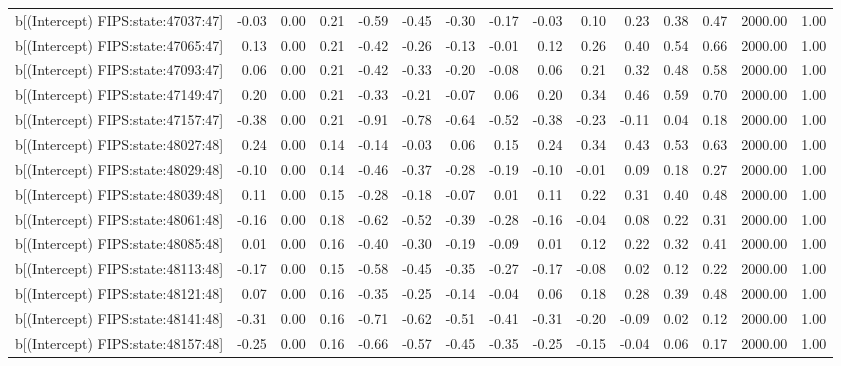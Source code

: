 \begin{table}[ht]
\begin{tabular}{rrrrrrrrrrrrrrr}
  b[(Intercept) FIPS:state:47037:47] & -0.03 & 0.00 & 0.21 & -0.59 & -0.45 & -0.30 & -0.17 & -0.03 & 0.10 & 0.23 & 0.38 & 0.47 & 2000.00 & 1.00 \\ 
  b[(Intercept) FIPS:state:47065:47] & 0.13 & 0.00 & 0.21 & -0.42 & -0.26 & -0.13 & -0.01 & 0.12 & 0.26 & 0.40 & 0.54 & 0.66 & 2000.00 & 1.00 \\ 
  b[(Intercept) FIPS:state:47093:47] & 0.06 & 0.00 & 0.21 & -0.42 & -0.33 & -0.20 & -0.08 & 0.06 & 0.21 & 0.32 & 0.48 & 0.58 & 2000.00 & 1.00 \\ 
  b[(Intercept) FIPS:state:47149:47] & 0.20 & 0.00 & 0.21 & -0.33 & -0.21 & -0.07 & 0.06 & 0.20 & 0.34 & 0.46 & 0.59 & 0.70 & 2000.00 & 1.00 \\ 
  b[(Intercept) FIPS:state:47157:47] & -0.38 & 0.00 & 0.21 & -0.91 & -0.78 & -0.64 & -0.52 & -0.38 & -0.23 & -0.11 & 0.04 & 0.18 & 2000.00 & 1.00 \\ 
  b[(Intercept) FIPS:state:48027:48] & 0.24 & 0.00 & 0.14 & -0.14 & -0.03 & 0.06 & 0.15 & 0.24 & 0.34 & 0.43 & 0.53 & 0.63 & 2000.00 & 1.00 \\ 
  b[(Intercept) FIPS:state:48029:48] & -0.10 & 0.00 & 0.14 & -0.46 & -0.37 & -0.28 & -0.19 & -0.10 & -0.01 & 0.09 & 0.18 & 0.27 & 2000.00 & 1.00 \\ 
  b[(Intercept) FIPS:state:48039:48] & 0.11 & 0.00 & 0.15 & -0.28 & -0.18 & -0.07 & 0.01 & 0.11 & 0.22 & 0.31 & 0.40 & 0.48 & 2000.00 & 1.00 \\ 
  b[(Intercept) FIPS:state:48061:48] & -0.16 & 0.00 & 0.18 & -0.62 & -0.52 & -0.39 & -0.28 & -0.16 & -0.04 & 0.08 & 0.22 & 0.31 & 2000.00 & 1.00 \\ 
  b[(Intercept) FIPS:state:48085:48] & 0.01 & 0.00 & 0.16 & -0.40 & -0.30 & -0.19 & -0.09 & 0.01 & 0.12 & 0.22 & 0.32 & 0.41 & 2000.00 & 1.00 \\ 
  b[(Intercept) FIPS:state:48113:48] & -0.17 & 0.00 & 0.15 & -0.58 & -0.45 & -0.35 & -0.27 & -0.17 & -0.08 & 0.02 & 0.12 & 0.22 & 2000.00 & 1.00 \\ 
  b[(Intercept) FIPS:state:48121:48] & 0.07 & 0.00 & 0.16 & -0.35 & -0.25 & -0.14 & -0.04 & 0.06 & 0.18 & 0.28 & 0.39 & 0.48 & 2000.00 & 1.00 \\ 
  b[(Intercept) FIPS:state:48141:48] & -0.31 & 0.00 & 0.16 & -0.71 & -0.62 & -0.51 & -0.41 & -0.31 & -0.20 & -0.09 & 0.02 & 0.12 & 2000.00 & 1.00 \\ 
  b[(Intercept) FIPS:state:48157:48] & -0.25 & 0.00 & 0.16 & -0.66 & -0.57 & -0.45 & -0.35 & -0.25 & -0.15 & -0.04 & 0.06 & 0.17 & 2000.00 & 1.00 \\ 

\end{tabular}
\end{table}
